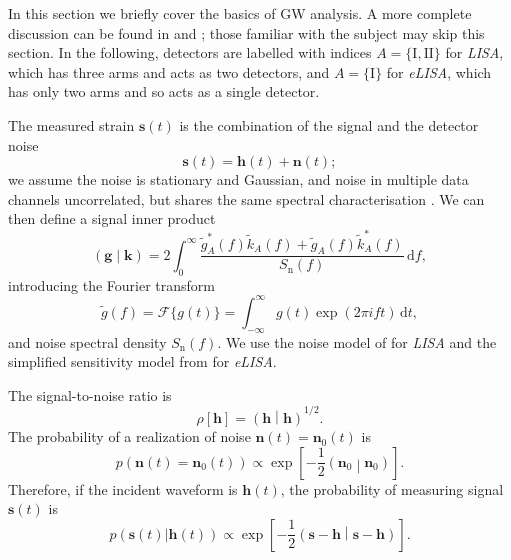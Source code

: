 \documentclass[useAMS,usedcolumn,usegraphicx,usenatbib]{mn2e}
\newcommand{\sub}[1]{\ensuremath{_\mathrm{#1}}}
\newcommand{\dd}{\ensuremath{\mathrm{d}}}
\newcommand{\intd}[4]{\ensuremath{\int_{#1}^{#2}{#3}\,\dd{#4}}}
\newcommand{\recip}[1]{\ensuremath{\frac{1}{#1}}}
\newcommand{\innerprod}[2]{\ensuremath{\left({#1}\middle|{#2}\right)}}
\begin{document}
In this section we briefly cover the basics of GW analysis. A more complete discussion can be found in \citet{Finn1992} and \citet{Cutler1994}; those familiar with the subject may skip this section. In the following, detectors are labelled with indices $A = \{\mathrm{I}, \mathrm{II}\}$ for \textit{LISA}, which has three arms and acts as two detectors, and $A = \{\mathrm{I}\}$ for \textit{eLISA}, which has only two arms and so acts as a single detector.

The measured strain $\boldsymbol{s}(t)$ is the combination of the signal and the detector noise
\begin{equation}
\boldsymbol{s}(t) = \boldsymbol{h}(t) + \boldsymbol{n}(t);
\end{equation}
we assume the noise is stationary and Gaussian, and noise in multiple data channels uncorrelated, but shares the same spectral characterisation \citep{Cutler1998}. We can then define a signal inner product \citep{Cutler1994}
\begin{equation}
\innerprod{\boldsymbol{g}}{\boldsymbol{k}} = 2\intd{0}{\infty}{\frac{\tilde{g}_A^\ast(f)\tilde{k}_A(f) + \tilde{g}_A(f)\tilde{k}_A^\ast(f)}{S\sub{n}(f)}}{f},
\label{eq:inner}
\end{equation}
introducing the Fourier transform
\begin{equation}
\tilde{g}(f) = \mathscr{F}\{g(t)\} = \intd{-\infty}{\infty}{g(t)\exp(2\pi i ft)}{t},
\end{equation}
and noise spectral density $S\sub{n}(f)$. We use the noise model of \citet{Barack2004} for \textit{LISA} and the simplified sensitivity model from \citet{Jennrich2011} for \textit{eLISA}.

The signal-to-noise ratio is
\begin{equation}
\rho[\boldsymbol{h}] = \innerprod{\boldsymbol{h}}{\boldsymbol{h}}^{1/2}.
\label{eq:SNR}
\end{equation}
The probability of a realization of noise $\boldsymbol{n}(t) = \boldsymbol{n}_0(t)$ is
\begin{equation}
p(\boldsymbol{n}(t) = \boldsymbol{n}_0(t)) \propto \exp\left[-\recip{2}\innerprod{\boldsymbol{n}_0}{\boldsymbol{n}_0}\right].
\end{equation}
Therefore, if the incident waveform is $\boldsymbol{h}(t)$, the probability of measuring signal $\boldsymbol{s}(t)$ is
\begin{equation}
p(\boldsymbol{s}(t)|\boldsymbol{h}(t)) \propto \exp\left[-\recip{2}\innerprod{\boldsymbol{s}-\boldsymbol{h}}{\boldsymbol{s}-\boldsymbol{h}}\right].
\label{eq:sig_prob}
\end{equation}
\end{document}

